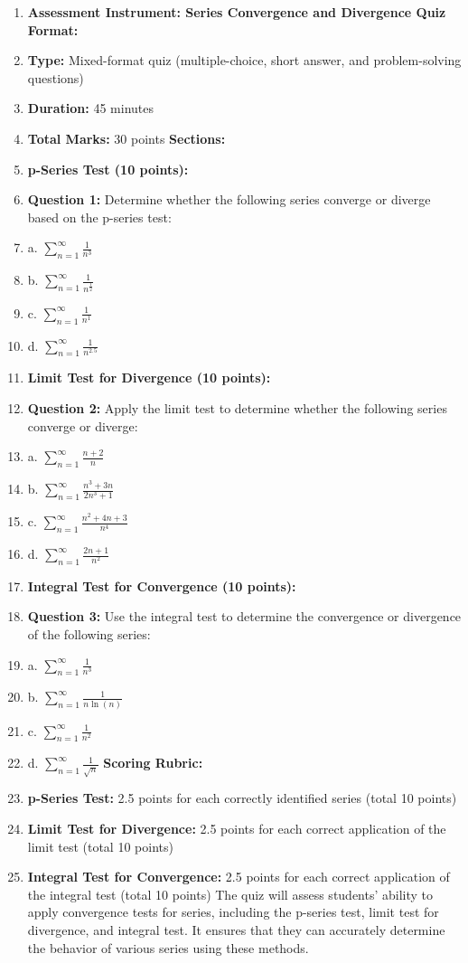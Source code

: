 \begin{enumerate}
    \item \textbf{Assessment Instrument: Series Convergence and Divergence Quiz} \textbf{Format:}
    \item \textbf{Type:} Mixed-format quiz (multiple-choice, short answer, and problem-solving questions)
    \item \textbf{Duration:} 45 minutes
    \item \textbf{Total Marks:} 30 points \textbf{Sections:}
    \item \textbf{p-Series Test (10 points):}
    \item \textbf{Question 1:} Determine whether the following series converge or diverge based on the p-series test:
    \item a. $\sum_{n=1}^{\infty} \frac{1}{n^{3}}$
    \item b. $\sum_{n=1}^{\infty} \frac{1}{n^{\frac{1}{2}}}$
    \item c. $\sum_{n=1}^{\infty} \frac{1}{n^{1}}$
    \item d. $\sum_{n=1}^{\infty} \frac{1}{n^{2.5}}$
    \item \textbf{Limit Test for Divergence (10 points):}
    \item \textbf{Question 2:} Apply the limit test to determine whether the following series converge or diverge:
    \item a. $\sum_{n=1}^{\infty} \frac{n+2}{n}$
    \item b. $\sum_{n=1}^{\infty} \frac{n^3 + 3n}{2n^3 + 1}$
    \item c. $\sum_{n=1}^{\infty} \frac{n^2 + 4n + 3}{n^4}$
    \item d. $\sum_{n=1}^{\infty} \frac{2n + 1}{n^2}$
    \item \textbf{Integral Test for Convergence (10 points):}
    \item \textbf{Question 3:} Use the integral test to determine the convergence or divergence of the following series:
    \item a. $\sum_{n=1}^{\infty} \frac{1}{n^3}$
    \item b. $\sum_{n=1}^{\infty} \frac{1}{n \ln(n)}$
    \item c. $\sum_{n=1}^{\infty} \frac{1}{n^{2}}$
    \item d. $\sum_{n=1}^{\infty} \frac{1}{\sqrt{n}}$ \textbf{Scoring Rubric:}
    \item \textbf{p-Series Test:} 2.5 points for each correctly identified series (total 10 points)
    \item \textbf{Limit Test for Divergence:} 2.5 points for each correct application of the limit test (total 10 points)
    \item \textbf{Integral Test for Convergence:} 2.5 points for each correct application of the integral test (total 10 points) The quiz will assess students' ability to apply convergence tests for series, including the p-series test, limit test for divergence, and integral test. It ensures that they can accurately determine the behavior of various series using these methods.
\end{enumerate}

